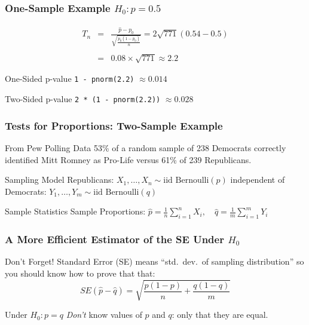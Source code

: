 \documentclass{beamer}
\begin{document}
\begin{frame}
	\frametitle{One-Sample Example $H_0\colon p = 0.5$}

\vspace{1em}

	\begin{eqnarray*}
		T_n &=& \frac{\widehat{p} - p_0}{\sqrt{\displaystyle \frac{p_0(1 - p_0)}{n}}} = 2 \sqrt{771}(0.54 - 0.5)\\ \\
		&=& 0.08 \times \sqrt{771} \approx 2.2
	\end{eqnarray*}
	\begin{block}
		{One-Sided p-value}
		\texttt{1 - pnorm(2.2)} $\approx 0.014$
	\end{block}
	\begin{block}
		{Two-Sided p-value}
		\texttt{2 * (1 - pnorm(2.2))} $\approx 0.028$
	\end{block}
\end{frame}
\begin{frame}
	\frametitle{Tests for Proportions: Two-Sample Example}
	\begin{block}
		{From Pew Polling Data}
		53\% of a random sample of 238 Democrats correctly identified Mitt Romney as Pro-Life versus 61\% of 239 Republicans.
	\end{block}
	\begin{block}
		{Sampling Model}
		Republicans: $X_1, \hdots, X_{n} \sim \mbox{iid Bernoulli}(p)$ independent of\\
		Democrats: $Y_1, \hdots,Y_{m} \sim \mbox{iid Bernoulli}(q)$ 
	\end{block}
	\begin{block}
		{Sample Statistics}
		Sample Proportions: $\displaystyle\widehat{p} = \frac{1}{n}\sum_{i=1}^{n} X_i, \quad\displaystyle\widehat{q} = \frac{1}{m}\sum_{i=1}^{m} Y_i$
	\end{block}

	\vspace{1em}

	\hfill \alert{}
\end{frame}
\begin{frame}
	\frametitle{A More Efficient Estimator of the SE Under $H_0$}
	\begin{alertblock}
		{Don't Forget!}
		Standard Error (SE) means ``std.\ dev.\ of sampling distribution'' so you should know how to prove that that:
	$$SE(\widehat{p} - \widehat{q}) = \sqrt{\frac{p(1-p)}{n} + \frac{q(1-q)}{m}}$$
	\end{alertblock}

	\begin{block}
		{Under $H_0\colon p = q$}
		\emph{Don't} know values of $p$ and $q$: only that they are equal.
	\end{block}

\end{frame}
\end{document}
